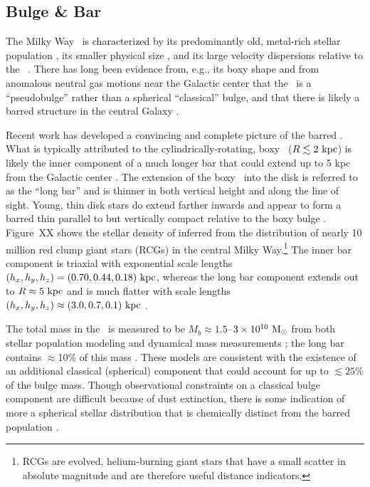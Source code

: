 \subsection{Bulge \& Bar}

The Milky Way \mwbulge\ is characterized by its predominantly old, metal-rich stellar population \citep[$t_{\rm age} \gtrsim 5~{\rm Gyr}$, ${[{\rm Fe}/{\rm H}]} \gtrsim -0.25$;][]{todo}, its smaller physical size \citep[$R \lesssim 1$--$2~\kpc$;][]{todo}, and its large velocity dispersions relative to the \mwdisk\ \citep[$\sigma_v \sim 100~\kms$;][]{todo}. There has long been evidence from, e.g., its boxy shape and from anomalous neutral gas motions near the Galactic center that the \mwbulge\ is a ``pseudobulge'' rather than a spherical ``classical'' bulge, and that there is likely a barred structure in the central Galaxy \citep{blitz91, binney91, weiland94, binney97}. 

Recent work has developed a convincing and complete picture of the barred \mwbulge. What is typically attributed to the cylindrically-rotating, boxy \mwbulge\ ($R \lesssim 2~\mathrm{kpc}$) is likely the inner component of a much longer bar that could extend up to 5 kpc from the Galactic center \citep{wegg13, todo}. The extension of the boxy \mwbulge\ into the disk is referred to as the ``long bar'' and is thinner in both vertical height and along the line of sight. Young, thin disk stars do extend farther inwards and appear to form a barred thin parallel to but vertically compact relative to the boxy bulge \citep{dekany15 todo}. Figure~XX shows the stellar density of  inferred from the distribution of nearly 10 million red clump giant stars (RCGs) in the central Milky Way.\footnote{RCGs are evolved, helium-burning giant stars that have a small scatter in absolute magnitude and are therefore useful distance indicators.} The inner bar component is triaxial with exponential scale lengths $(h_x, h_y, h_z) = (0.70, 0.44, 0.18)~\mathrm{kpc}$, whereas the long bar component extends out to $R\approx 5~\mathrm{kpc}$ and is much flatter with scale lengths $(h_x, h_y, h_z) \approx (3.0, 0.7, 0.1)~\mathrm{kpc}$ \citep{wegg15}. 

The total mass in the \mwbulge\ is measured to be $M_b \approx 1.5$--$3 \times 10^{10}~\mathrm{M}_\odot$ from both stellar population modeling \citep{dwek95, valenti15} and dynamical mass measurements \citep{zhao94, portail15}; the long bar contains $\approx$10\% of this mass \citep{wegg15}. These models are consistent with the existence of an additional classical (spherical) component that could account for up to $\lesssim 25\%$ of the bulge mass. Though observational constraints on a classical bulge component are difficult because of dust extinction, there is some indication of more a spherical stellar distribution that is chemically distinct from the barred population \citep{ness13a,ness13b, todo}.

